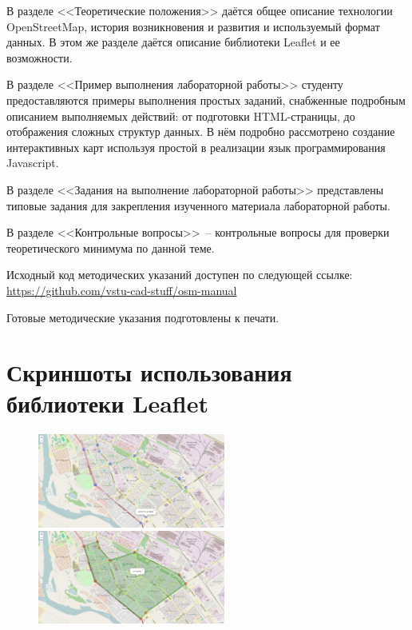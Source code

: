 \documentclass[a4paper, 14pt]{extreport}
\begin{document}
    В разделе <<Теоретические положения>> даётся общее описание технологии
    OpenStreetMap, история возникновения и развития и используемый формат
    данных. В этом же разделе даётся описание библиотеки Leaflet и ее
    возможности.

    В разделе <<Пример выполнения лабораторной работы>> студенту
    предоставляются примеры выполнения простых заданий, снабженные подробным
    описанием выполняемых действий: от подготовки HTML-страницы, до отображения
    сложных структур данных. В нём подробно рассмотрено создание интерактивных
    карт используя простой в реализации язык программирования Javascript.

    В разделе <<Задания на выполнение лабораторной работы>> представлены
    типовые задания для закрепления изученного материала лабораторной работы.

    В разделе <<Контрольные вопросы>>~-- контрольные вопросы для проверки
    теоретического минимума по данной теме.
    
    Исходный код методических указаний доступен по следующей ссылке:\\
    \url{https://github.com/vstu-cad-stuff/osm-manual}
    
    Готовые методические указания подготовлены к печати.

    \section{Скриншоты использования библиотеки Leaflet}
    \vspace*{-2em}\begin{figure}[ht!]
        \center
        \includegraphics[width=0.55\textwidth]{e1}
        \includegraphics[width=0.55\textwidth]{e2}
    \end{figure}
\end{document}
